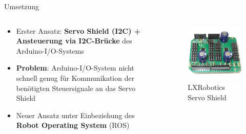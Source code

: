 \documentclass{beamer}
\begin{document}
\begin{frame}{Umsetzung}
\begin{columns}
	\begin{column}{0.7\textwidth}
\begin{itemize}
	\item Erster Ansatz: \textbf{Servo Shield (I2C) + Ansteuerung via I2C-Br\"ucke} des Arduino-I/O-Systems
\end{itemize}
\begin{itemize}
	\item \textbf{Problem}: Arduino-I/O-System nicht schnell genug f\"ur Kommunikation der ben\"otigten Steuersignale an das Servo Shield
\end{itemize}
\begin{itemize}
	\item Neuer Ansatz unter Einbeziehung des \textbf{Robot Operating System} (ROS)
\end{itemize}
	\end{column}
	\begin{column}{0.3\textwidth}
		\begin{figure}[H]
			\centering
			\includegraphics[width=1.0\textwidth]{./images/servo-shield.jpg}
			\caption{LXRobotics Servo Shield}
		\end{figure}
	\end{column}
\end{columns}
\end{frame}
\end{document}
